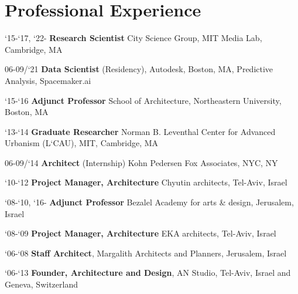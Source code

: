 \section*{Professional Experience}

\begin{tablist}
   \item[`15-`17, `22-]\tab\textbf{Research Scientist}
   \newline
   City Science Group, MIT Media Lab, Cambridge, MA

   \item[06-09/`21]\tab\textbf{Data Scientist} (Residency),
   \newline
   Autodesk, Boston, MA, Predictive Analysis, Spacemaker.ai

   \item[`15-`16]\tab\textbf{Adjunct Professor}
   \newline
   School of Architecture, Northeastern University, Boston, MA

   \item[`13-`14]\tab\textbf{Graduate Researcher}
   \newline
   Norman B. Leventhal Center for Advanced Urbanism (L`CAU), MIT, Cambridge, MA

   \item[06-09/`14]\tab\textbf{Architect} (Internship)
   \newline
   Kohn Pedersen Fox Associates, NYC, NY

   \item[`10-`12]\tab
   \textbf{Project Manager, Architecture}
   \newline
   Chyutin architects, Tel-Aviv, Israel

   \item[`08-`10, `16-]\tab\textbf{Adjunct Professor}
   \newline
   Bezalel Academy for arts \& design, Jerusalem, Israel

   \item[`08-`09]\tab\textbf{Project Manager, Architecture}
   \newline
   EKA architects, Tel-Aviv, Israel

   \item[`06-`08]\tab\textbf{Staff Architect},
   \newline
   Margalith Architects and Planners, Jerusalem, Israel

   \item[`06-`13]\tab
   \textbf{Founder, Architecture and Design},
   \newline
   AN Studio, Tel-Aviv, Israel and Geneva, Switzerland
\end{tablist}
